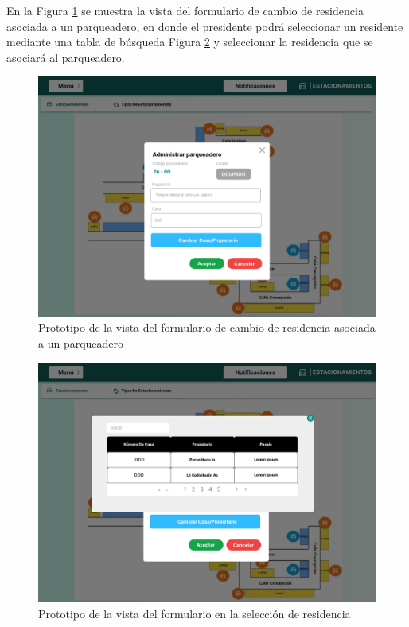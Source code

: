 En la Figura \ref{fig:parqueaderos formulario} se muestra la vista del formulario de cambio de residencia asociada a un parqueadero, en donde el presidente podrá seleccionar un residente mediante una tabla de búsqueda Figura \ref{fig:parqueaderos formulario seleccion residente} y seleccionar la residencia que se asociará al parqueadero.

\begin{figure}[H]
    \centering
    \includegraphics[width=1\textwidth]{resources/images/estacionamientos-organization-form}
    \caption{Prototipo de la vista del formulario de cambio de residencia asociada a un parqueadero}
    \label{fig:parqueaderos formulario}
\end{figure}

\begin{figure}[H]
    \centering
    \includegraphics[width=1\textwidth]{resources/images/estacionamientos-form-vista}
    \caption{Prototipo de la vista del formulario en la selección de residencia}
    \label{fig:parqueaderos formulario seleccion residente}
\end{figure}

